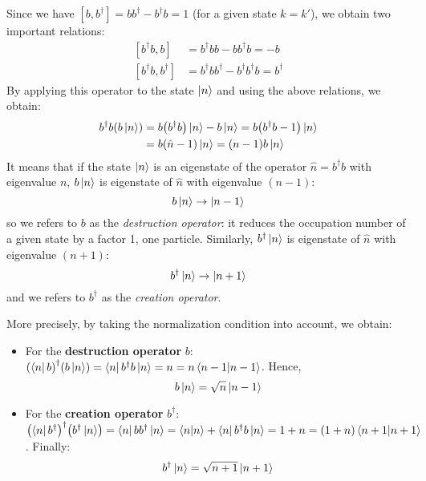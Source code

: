 \documentclass[../main/main.tex]{subfiles}
\begin{document}
Since we have \( [b,b^\dag]= b b^\dag - b^\dag b = 1 \) (for a given state \( k=k' \)), we obtain two important relations:  
\begin{subequations}
\begin{align}
  [b^\dag b,b] &= b^\dag b b - b b^\dag b = -b \\
  [b^\dag b, b^\dag] &= b^\dag b b^\dag - b^\dag b^\dag b = b^\dag
\end{align}
\label{eq:2_10}
\end{subequations}
By applying this operator to the state \( \ket{n}  \) and using the above relations, we obtain:
\begin{equation*}
\begin{split}
    b^\dag b \qty(b \ket{n} ) &= b \qty(b^\dag b) \ket{n} - b \ket{n}
    = b \qty(b^\dag b - 1) \ket{n} \\
    &= b \qty(\hat{n} -1 ) \ket{n} = \qty(n-1) b \ket{n}
\end{split}
\end{equation*}
It means that if the state \( \ket{n}  \) is an eigenstate of the operator \( \hat{n} = b^\dag b  \) with eigenvalue \( n \), \( b \ket{n}  \) is eigenstate of \( \hat{n}  \) with eigenvalue \( (n-1) \):
\begin{equation*}
  b \ket{n} \rightarrow \ket{n-1}
\end{equation*}
so we refers to \( b \) as the \emph{destruction operator}: it reduces the occupation number of a given state by a factor 1, one particle. Similarly, \( b^\dag \ket{n}  \) is eigenstate of \( \hat{n}  \) with eigenvalue \( (n+1) \):
\begin{equation*}
  b^\dag \ket{n} \rightarrow \ket{n+1}
\end{equation*}
and we refers to \( b^\dag \) as the \emph{creation operator}.

More precisely, by taking the normalization condition into account, we obtain:
\begin{itemize}
\item For the \textbf{destruction operator} \( b \): \( \qty(\bra{n} b )^\dag \qty(b \ket{n} ) = \bra{n} b^\dag b \ket{n} = n = n \bra{n-1}\ket{n-1}      \). Hence,
\begin{equation}
  b \ket{n} = \sqrt{n} \ket{n-1}
\end{equation}
\item For the \textbf{creation operator} \( b^\dag \):  \( \qty(\bra{n} b^\dag )^\dag \qty(b^\dag \ket{n} ) = \bra{n} b b^\dag \ket{n} = \braket{n}{n} + \bra{n} b^\dag b \ket{n }   = 1 + n = \qty(1+n) \braket{n+1}{n+1}     \). Finally:
\begin{equation}
  b^\dag \ket{n} = \sqrt{n+1} \ket{n+1}
\end{equation}
\end{itemize}
\end{document}
